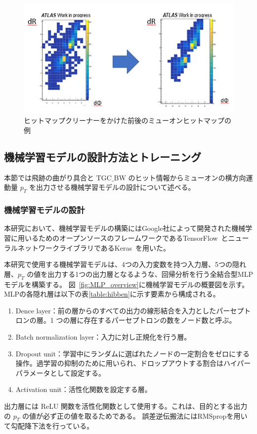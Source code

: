 \begin{figure}[tb]
  \centering
  \includegraphics[clip, width=14cm]{fig/4/cleaner.png}
  \caption{ヒットマップクリーナーをかけた前後のミューオンヒットマップの例}
  \label{fig:hitmapcleaner}
\end{figure}


\subsection{機械学習モデルの設計方法とトレーニング}
本節では飛跡の曲がり具合と TGC$\_$BW のヒット情報からミューオンの横方向運動量 $p_T$ を出力させる機械学習モデルの設計について述べる。

\subsubsection{機械学習モデルの設計}
本研究において、機械学習モデルの構築にはGoogle社によって開発された機械学習に用いるためのオープンソースのフレームワークであるTensorFlow~\cite{article:TensorFlow}とニューラルネットワークライブラリであるKeras~\cite{article:keras}を用いた。

本研究で使用する機械学習モデルは、4つの入力変数を持つ入力層、5つの隠れ層、$p_T$ の値を出力する1つの出力層となるような、回帰分析を行う全結合型MLPモデルを構築する。
図~\ref{fig:MLP_overview}に機械学習モデルの概要図を示す。
MLPの各隠れ層は以下の表\ref{table:hibben}に示す要素から構成される。
\begin{enumerate}\label{table:hibben}
   \item Dence layer：前の層からのすべての出力の線形結合を入力としたパーセプトロンの層。1 つの層に存在するパーセプトロンの数をノード数と呼ぶ。
   \item Batch normalization layer：入力に対し正規化を行う層。
   \item Dropout unit：学習中にランダムに選ばれたノードの一定割合をゼロにする操作。過学習の抑制のために用いられ、ドロップアウトする割合はハイパーパラメータとして設定する。
   \item Activation unit：活性化関数を設定する層。
\end{enumerate}
出力層には ReLU 関数を活性化関数として使用する。これは、目的とする出力の $p_T$ の値が必ず正の値を取るためである。
誤差逆伝搬法にはRMSpropを用いて勾配降下法を行っている。

